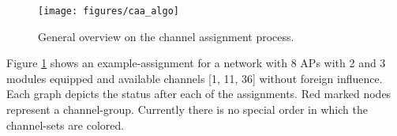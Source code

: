     \begin{figure}[h!]
      \centering
      \texttt{[image: figures/caa\_algo]}
      \caption{General overview on the channel assignment process.}
      \label{fig:caa_algo}
    \end{figure}

    Figure \ref{fig:caa_algo} shows an example-assignment for a network with 8 APs with 2 and 3 modules equipped and available channels [1, 11, 36] without foreign influence. 
    Each graph depicts the status after each of the assignments. 
    Red marked nodes represent a channel-group. 
    Currently there is no special order in which the channel-sets are colored. 
